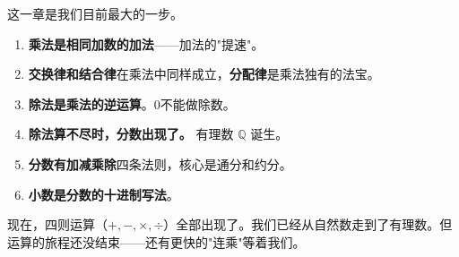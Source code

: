 
这一章是我们目前最大的一步。

\begin{enumerate}
  \item \textbf{乘法是相同加数的加法}——加法的"提速"。
  \item \textbf{交换律和结合律}在乘法中同样成立，\textbf{分配律}是乘法独有的法宝。
  \item \textbf{除法是乘法的逆运算}。0不能做除数。
  \item \textbf{除法算不尽时，分数出现了。} 有理数 $\mathbb{Q}$ 诞生。
  \item \textbf{分数有加减乘除}四条法则，核心是通分和约分。
  \item \textbf{小数是分数的十进制写法}。
\end{enumerate}

现在，四则运算（$+,-,\times,\div$）全部出现了。我们已经从自然数走到了有理数。但运算的旅程还没结束——还有更快的"连乘"等着我们。

\bigskip

\begin{center}
\end{center}
